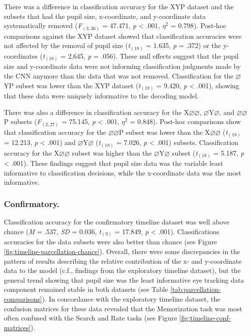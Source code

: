\documentclass[
  english,
  man,floatsintext]{apa6}
\begin{document}
There was a difference in classification accuracy for the XYP dataset and the subsets that had the pupil size, x-coordinate, and y-coordinate data systematically removed (\emph{F}\(_{(3, 36)}\) = 47.471, \emph{p} \textless{} .001, \textit{$\eta$}\(^{2}\) = 0.798). Post-hoc comparisons against the XYP dataset showed that classification accuracies were not affected by the removal of pupil size (\emph{t}\(_{(18)}\) = 1.635, \emph{p} = .372) or the y-coordinates (\emph{t}\(_{(18)}\) = 2.645, \emph{p} = .056). These null effects suggest that the pupil size and y-coordinate data were not informing classification judgments made by the CNN anymore than the data that was not removed. Classification for the \(\varnothing\)YP subset was lower than the XYP dataset (\emph{t}\(_{(18)}\) = 9.420, \emph{p} \textless{} .001), showing that these data were uniquely informative to the decoding model.

There was also a difference in classification accuracy for the X\(\varnothing\varnothing\), \(\varnothing\)Y\(\varnothing\), and \(\varnothing\varnothing\)P subsets (\emph{F}\(_{(2, 27)}\) = 75.145, \emph{p} \textless{} .001, \textit{$\eta$}\(^{2}\) = 0.848). Post-hoc comparisons show that classification accuracy for the \(\varnothing\varnothing\)P subset was lower than the X\(\varnothing\varnothing\) (\emph{t}\(_{(18)}\) = 12.213, \emph{p} \textless{} .001) and \(\varnothing\)Y\(\varnothing\) (\emph{t}\(_{(18)}\) = 7.026, \emph{p} \textless{} .001) subsets. Classification accuracy for the X\(\varnothing\varnothing\) subset was higher than the \(\varnothing\)Y\(\varnothing\) subset (\emph{t}\(_{(18)}\) = 5.187, \emph{p} \textless{} .001). These findings suggest that pupil size data was the variable least informative to classification decisions, while the x-coordinate data was the most informative.

\subsubsection{Confirmatory.}

Classification accuracy for the confirmatory timeline dataset was well above chance (\emph{M} = .537, \emph{SD} = 0.036, \emph{t}\(_{(9)}\) = 17.849, \emph{p} \textless{} .001). Classifications accuracies for the data subsets were also better than chance (see Figure \ref{fig:timeline-parcellation-chance}). Overall, there were some discrepancies in the pattern of results describing the relative contribution of the x- and y-coordinate data to the model (c.f., findings from the exploratory timeline dataset), but the general trend showing that pupil size was the least informative eye tracking data component remained stable in both datasets (see Table \ref{tab:parcellation-comparisons}). In concordance with the exploratory timeline dataset, the confusion matrices for these data revealed that the Memorization task was most often confused with the Search and Rate tasks (see Figure \ref{fig:timeline-conf-matrices}).
\end{document}
